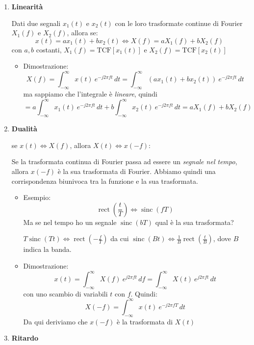 \documentclass[
  paper=a4,
  ,captions=tableheading
]{scrartcl}
\providecommand{\tightlist}{%
  \setlength{\itemsep}{0pt}\setlength{\parskip}{0pt}}
\begin{document}
\begin{enumerate}
\def\labelenumi{\arabic{enumi}.}
\setcounter{enumi}{12}
\item
  \textbf{Linearità}

  Dati due segnali \(x_1(t)\) e \(x_2(t)\) con le loro trasformate
  continue di Fourier \(X_1(f)\) e \(X_2(f)\), allora se: \[
  x(t) = ax_1(t) + bx_2(t) \Longleftrightarrow X(f)=aX_1(f)+bX_2(f)
  \] con \(a,b\) costanti, \(X_1(f)=\text{TCF}[x_1(t)]\) e
  \(X_2(f)=\text{TCF}[x_2(t)]\)

  \begin{itemize}
  \tightlist
  \item
    Dimostrazione: \[
      X(f)= \int_{-\infty}^{\infty}x(t)\ e^{-j2\pi ft}\,dt = \int_{-\infty}^{\infty}(ax_1(t) + bx_2(t)) \ e^{-j2\pi ft}\,dt
      \] ma sappiamo che l'integrale è \emph{lineare}, quindi \[
      = a\int_{-\infty}^{\infty}x_1(t)\ e^{-j2\pi ft}\,dt + b\int_{-\infty}^{\infty}x_2(t)\ e^{-j2\pi ft}\,dt = aX_1(f)+bX_2(f)
      \]
  \end{itemize}
\item
  \textbf{Dualità}

  se \(x(t)\Longleftrightarrow X(f)\), allora
  \(X(t)\Longleftrightarrow x(-f)\):

  Se la trasformata continua di Fourier passa ad essere un \emph{segnale
  nel tempo}, allora \(x(-f)\) è la sua trasformata di Fourier. Abbiamo
  quindi una corrispondenza biunivoca tra la funzione e la sua
  trasformata.

  \begin{itemize}
  \item
    Esempio: \[
      \mathop{\mathrm{rect}}(\frac{t}{T})\Longleftrightarrow\mathop{\mathrm{sinc}}(fT)
      \] Ma se nel tempo ho un segnale \(\mathop{\mathrm{sinc}}(bT)\)
    qual è la sua trasformata?

    \(T\mathop{\mathrm{sinc}}(Tt) \Longleftrightarrow \mathop{\mathrm{rect}}({-\frac{f}{T}})\)
    da cui
    \(\mathop{\mathrm{sinc}}(Bt)\Longleftrightarrow \frac{1}{B}\mathop{\mathrm{rect}}(\frac{t}{B})\),
    dove \(B\) indica la banda.
  \item
    Dimostrazione: \[
      x(t) =\int_{-\infty}^{\infty}X(f)\ e^{j2\pi ft} \,df = \int_{-\infty}^{\infty}X(t)\ e^{j2\pi ft} \,dt 
      \] con uno scambio di variabili \(t\) con \(f\). Quindi: \[
      X(-f)=\int_{-\infty}^{\infty}x(t)\ e^{-j2\pi fT} \,dt 
      \] Da qui deriviamo che \(x(-f)\) è la trasformata di \(X(t)\)
  \end{itemize}
\item
  \textbf{Ritardo}


\end{enumerate}
\end{document}
